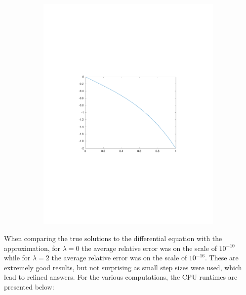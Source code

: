 \documentclass{article}
\begin{document}
\begin{figure}[H]
\begin{subfigure}{0.48\textwidth}
\includegraphics[width=\linewidth]{truesolution_lambda_2}
\end{subfigure}\hspace*{\fill}
\end{figure}

When comparing the true solutions to the differential equation with the approximation, for $\lambda = 0$ the average relative error was on the scale of $10^{-10}$ while for $\lambda = 2$ the average relative error was on the scale of $10^{-16}$.
These are extremely good results, but not surprising as small step sizes were used, which lead to refined answers.
For the various computations, the CPU runtimes are presented below:
\end{document}
